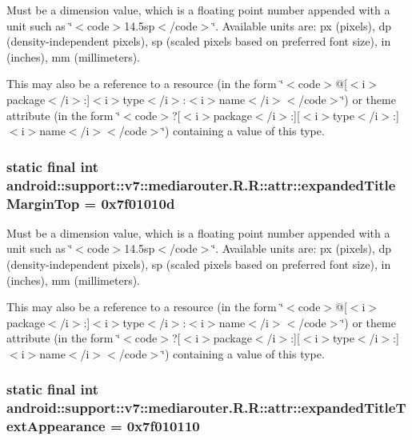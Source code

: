 Must be a dimension value, which is a floating point number appended with a unit such as \char`\"{}$<$code$>$14.5sp$<$/code$>$\char`\"{}. Available units are: px (pixels), dp (density-independent pixels), sp (scaled pixels based on preferred font size), in (inches), mm (millimeters). 

This may also be a reference to a resource (in the form \char`\"{}$<$code$>$@\mbox{[}$<$i$>$package$<$/i$>$:\mbox{]}$<$i$>$type$<$/i$>$:$<$i$>$name$<$/i$>$$<$/code$>$\char`\"{}) or theme attribute (in the form \char`\"{}$<$code$>$?\mbox{[}$<$i$>$package$<$/i$>$:\mbox{]}\mbox{[}$<$i$>$type$<$/i$>$:\mbox{]}$<$i$>$name$<$/i$>$$<$/code$>$\char`\"{}) containing a value of this type. \hypertarget{classandroid_1_1support_1_1v7_1_1mediarouter_1_1_r_1_1attr_7f9330f0244e6c366add8fcf866354d3}{
\subsubsection[{expandedTitleMarginTop}]{\setlength{\rightskip}{0pt plus 5cm}static final int android::support::v7::mediarouter.R.R::attr::expandedTitleMarginTop = 0x7f01010d}}
\label{classandroid_1_1support_1_1v7_1_1mediarouter_1_1_r_1_1attr_7f9330f0244e6c366add8fcf866354d3}


Must be a dimension value, which is a floating point number appended with a unit such as \char`\"{}$<$code$>$14.5sp$<$/code$>$\char`\"{}. Available units are: px (pixels), dp (density-independent pixels), sp (scaled pixels based on preferred font size), in (inches), mm (millimeters). 

This may also be a reference to a resource (in the form \char`\"{}$<$code$>$@\mbox{[}$<$i$>$package$<$/i$>$:\mbox{]}$<$i$>$type$<$/i$>$:$<$i$>$name$<$/i$>$$<$/code$>$\char`\"{}) or theme attribute (in the form \char`\"{}$<$code$>$?\mbox{[}$<$i$>$package$<$/i$>$:\mbox{]}\mbox{[}$<$i$>$type$<$/i$>$:\mbox{]}$<$i$>$name$<$/i$>$$<$/code$>$\char`\"{}) containing a value of this type. \hypertarget{classandroid_1_1support_1_1v7_1_1mediarouter_1_1_r_1_1attr_c430d4812ebfa7bf792f6ce3e7a772d9}{
\subsubsection[{expandedTitleTextAppearance}]{\setlength{\rightskip}{0pt plus 5cm}static final int android::support::v7::mediarouter.R.R::attr::expandedTitleTextAppearance = 0x7f010110}}
\label{classandroid_1_1support_1_1v7_1_1mediarouter_1_1_r_1_1attr_c430d4812ebfa7bf792f6ce3e7a772d9}


